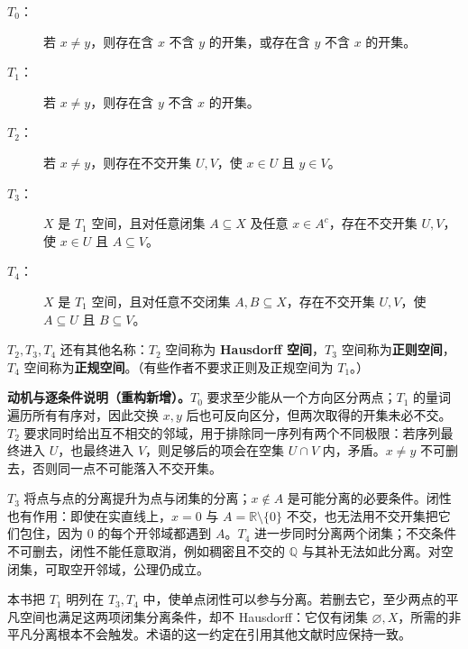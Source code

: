 \documentclass[../../main.tex]{subfiles}%
\begin{document}
\begin{definition}[分离公理]\label{definition:ch04-separation-axioms}
\begin{description}
\item[$T_0$：] 若 $x\ne y$，则存在含 $x$ 不含 $y$ 的开集，或存在含 $y$ 不含 $x$ 的开集。
\item[$T_1$：] 若 $x\ne y$，则存在含 $y$ 不含 $x$ 的开集。
\item[$T_2$：] 若 $x\ne y$，则存在不交开集 $U,V$，使 $x\in U$ 且 $y\in V$。
\item[$T_3$：] $X$ 是 $T_1$ 空间，且对任意闭集 $A\subseteq X$ 及任意 $x\in A^c$，存在不交开集 $U,V$，使 $x\in U$ 且 $A\subseteq V$。
\item[$T_4$：] $X$ 是 $T_1$ 空间，且对任意不交闭集 $A,B\subseteq X$，存在不交开集 $U,V$，使 $A\subseteq U$ 且 $B\subseteq V$。
\end{description}
\end{definition}
\begin{definition}\label{definition:ch04-hausdorff-regular-normal}
$T_2,T_3,T_4$ 还有其他名称：$T_2$ 空间称为 \textbf{Hausdorff 空间}，$T_3$ 空间称为\textbf{正则空间}，$T_4$ 空间称为\textbf{正规空间}。（有些作者不要求正则及正规空间为 $T_1$。）
\end{definition}
\begin{remark}
\textbf{动机与逐条件说明（重构新增）。}$T_0$ 要求至少能从一个方向区分两点；$T_1$ 的量词遍历所有有序对，因此交换 $x,y$ 后也可反向区分，但两次取得的开集未必不交。$T_2$ 要求同时给出互不相交的邻域，用于排除同一序列有两个不同极限：若序列最终进入 $U$，也最终进入 $V$，则足够后的项会在空集 $U\cap V$ 内，矛盾。$x\ne y$ 不可删去，否则同一点不可能落入不交开集。

$T_3$ 将点与点的分离提升为点与闭集的分离；$x\notin A$ 是可能分离的必要条件。闭性也有作用：即使在实直线上，$x=0$ 与 $A=\mathbb R\setminus\{0\}$ 不交，也无法用不交开集把它们包住，因为 $0$ 的每个开邻域都遇到 $A$。$T_4$ 进一步同时分离两个闭集；不交条件不可删去，闭性不能任意取消，例如稠密且不交的 $\mathbb Q$ 与其补无法如此分离。对空闭集，可取空开邻域，公理仍成立。

本书把 $T_1$ 明列在 $T_3,T_4$ 中，使单点闭性可以参与分离。若删去它，至少两点的平凡空间也满足这两项闭集分离条件，却不 Hausdorff：它仅有闭集 $\varnothing,X$，所需的非平凡分离根本不会触发。术语的这一约定在引用其他文献时应保持一致。
\end{remark}
\end{document}
